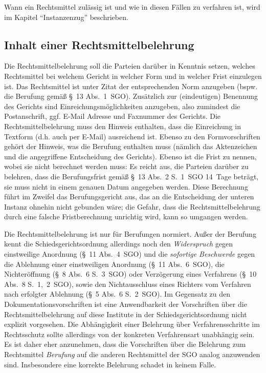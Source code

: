 Wann ein Rechtsmittel zulässig ist und wie in diesen Fällen zu verfahren ist, wird im Kapitel \enquote{Instanzenzug} beschrieben.

\subsection{Inhalt einer Rechtsmittelbelehrung}
Die Rechtsmittelbelehrung soll die Parteien darüber in Kenntnis setzen, welches Rechtsmittel bei welchem Gericht in welcher Form und in welcher Frist einzulegen ist.
Das Rechtsmittel ist unter Zitat der entsprechenden Norm anzugeben (bspw. die Berufung gemäß \S~13 Abs.~1~SGO).
Zusätzlich zur (eindeutigen) Benennung des Gerichts sind Einreichungsmöglichkeiten anzugeben, also zumindest die Postanschrift, ggf. E-Mail Adresse und Faxnummer des Gerichts.
Die Rechtsmittelbelehrung muss den Hinweis enthalten, dass die Einreichung in Textform (d.h. auch per E-Mail) ausreichend ist.
Ebenso zu den Formvorschriften gehört der Hinweis, was die Berufung enthalten muss (nämlich das Aktenzeichen und die angegriffene Entscheidung des Gerichts).
Ebenso ist die Frist zu nennen, wobei sie nicht berechnet werden muss:
Es reicht aus, die Parteien darüber zu belehren, dass die Berufungsfrist gemäß \S~13 Abs.~2 S.~1~SGO 14~Tage beträgt, sie muss nicht in einem genauen Datum angegeben werden.
Diese Berechnung führt im Zweifel das Berufungsgericht aus, das an die Entscheidung der unteren Instanz ohnehin nicht gebunden wäre; die Gefahr, dass die Rechtsmittelbelehrung durch eine falsche Fristberechnung unrichtig wird, kann so umgangen werden.

Die Rechtsmittelbelehrung ist nur für Berufungen normiert.
Außer der Berufung kennt die Schiedsgerichtsordnung allerdings noch den \emph{Widerspruch} gegen einstweilige Anordnung (\S~11 Abs.~4~SGO) und die \emph{sofortige Beschwerde} gegen die Ablehnung einer einstweiligen Anordnung (\S~11 Abs.~6~SGO), die Nichteröffnung (\S~8 Abs.~6 S.~3~SGO) oder Verzögerung eines Verfahrens (\S~10 Abs.~8 S.~1,~2~SGO), sowie den Nichtausschluss eines Richters vom Verfahren nach erfolgter Ablehnung (\S~5 Abs.~6 S.~2~SGO).
Im Gegensatz zu den Dokumentationsvorschriften ist eine Anwendbarkeit der Vorschriften über die Rechtsmittelbelehrung auf diese Institute in der Schiedsgerichtsordnung nicht explizit vorgesehen.
Die Abhängigkeit einer Belehrung über Verfahrensschritte im Rechtsschutz sollte allerdings von der konkreten Verfahrensart unabhängig sein.
Es ist daher eher anzunehmen, dass die Vorschriften über die Belehrung zum Rechtsmittel \emph{Berufung} auf die anderen Rechtsmittel der SGO analog anzuwenden sind.
Insbesondere eine korrekte Belehrung schadet in keinem Falle.

